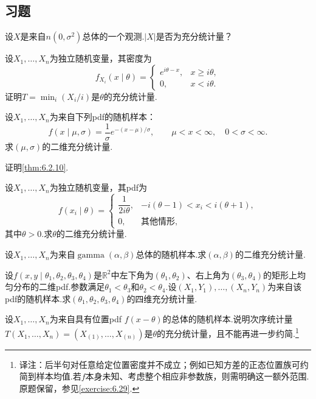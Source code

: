 \subsection{习题}\label{sec:6.5}
\begin{exercise}\label{exercise:6.1}
设$X$是来自$n(0,\sigma^2)$总体的一个观测.$|X|$是否为充分统计量？
\end{exercise}
\begin{exercise}\label{exercise:6.2}
设$X_1,\ldots,X_n$为独立随机变量，其密度为
$$f_{X_i}(x\mid\theta)=\begin{cases}e^{i\theta-x},&x\ge i\theta,\\0,&x<i\theta.\end{cases}$$
证明$T=\min_i(X_i/i)$是$\theta$的充分统计量.
\end{exercise}
\begin{exercise}\label{exercise:6.3}
设$X_1,\ldots,X_n$为来自下列pdf的随机样本：
$$f(x\mid\mu,\sigma)=\frac1\sigma e^{-(x-\mu)/\sigma},\qquad\mu<x<\infty,\quad0<\sigma<\infty.$$
求$(\mu,\sigma)$的二维充分统计量.
\end{exercise}
\begin{exercise}\label{exercise:6.4}
证明\autoref{thm:6.2.10}.
\end{exercise}
\begin{exercise}\label{exercise:6.5}
设$X_1,\ldots,X_n$为独立随机变量，其pdf为
$$f(x_i\mid\theta)=\begin{cases}\dfrac1{2i\theta},&-i(\theta-1)<x_i<i(\theta+1),\\0,&\text{其他情形},\end{cases}$$
其中$\theta>0$.求$\theta$的二维充分统计量.
\end{exercise}
\begin{exercise}\label{exercise:6.6}
设$X_1,\ldots,X_n$为来自$\operatorname{gamma}(\alpha,\beta)$总体的随机样本.求$(\alpha,\beta)$的二维充分统计量.
\end{exercise}
\begin{exercise}\label{exercise:6.7}
设$f(x,y\mid\theta_1,\theta_2,\theta_3,\theta_4)$是$\mathbb R^2$中左下角为$(\theta_1,\theta_2)$、右上角为$(\theta_3,\theta_4)$的矩形上均匀分布的二维pdf.参数满足$\theta_1<\theta_3$和$\theta_2<\theta_4$.设$(X_1,Y_1),\ldots,(X_n,Y_n)$为来自该pdf的随机样本.求$(\theta_1,\theta_2,\theta_3,\theta_4)$的四维充分统计量.
\end{exercise}
\begin{exercise}\label{exercise:6.8}
设$X_1,\ldots,X_n$为来自具有位置pdf $f(x-\theta)$的总体的随机样本.说明次序统计量$T(X_1,\ldots,X_n)=(X_{(1)},\ldots,X_{(n)})$是$\theta$的充分统计量，且不能再进一步约简.\footnote{译注：后半句对任意给定位置密度并不成立；例如已知方差的正态位置族可约简到样本均值.若$f$本身未知、考虑整个相应非参数族，则需明确这一额外范围.原题保留，参见\autoref{exercise:6.29}.}
\end{exercise}
